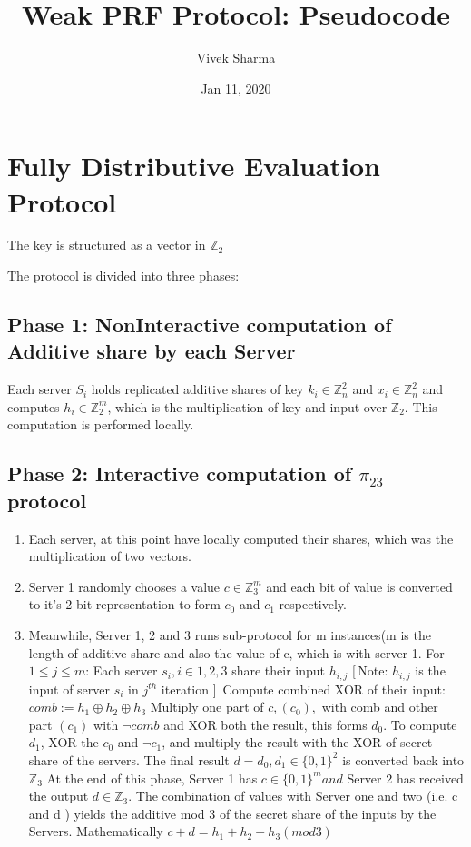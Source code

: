 \documentclass[11pt]{article}
\title{Weak PRF Protocol: Pseudocode}
\author{Vivek Sharma}
\date{Jan 11, 2020}
\begin{document}
\maketitle


\section{Fully Distributive Evaluation Protocol}
The key is structured as a vector in $\mathbb{Z}_2$


The protocol is divided into three phases:

\subsection{Phase 1: NonInteractive computation of Additive share by each Server} 
Each server $S_{i}$ holds replicated additive shares of key $k_{i} \in \mathbb{Z}_{n}^{2}$ and $x_{i} \in \mathbb{Z}_{n}^{2}$ and computes $h_{i} \in \mathbb{Z}_{2}^{m}$, which is the multiplication of key and input over $\mathbb{Z}_2$. This computation is performed locally. 
\subsection{Phase 2: Interactive computation of $\pi_{23}$ protocol}

\begin{enumerate}
	\item Each server, at this point have locally computed their shares, which was the multiplication of two vectors.
	\item Server 1 randomly chooses a value $c \in \mathbb{Z}_{3}^{m}$ and each bit of value is converted to it's 2-bit representation to form $c_{0}$ and $c_{1}$ respectively. 
	\item Meanwhile, Server 1, 2 and 3 runs sub-protocol for m instances(m is the length of additive share and also the value of c, which is with server 1.
	\subitem For $1 \leq j \leq m$:
	\subitem Each server $s_{i} , i \in {1,2,3}$ share their input $h_{i,j}$ [\,Note: $h_{i,j}$ is the input of server $s_{i}$ in $j^{th}$ iteration ]\,
	\subitem Compute combined XOR of their input: $comb := h_{1} \oplus h_{2} \oplus h_{3}$
	\subitem Multiply one part of $c,(c_{0}),$ with comb and other part $(c_{1})$ with $\neg{comb}$ and XOR both the result, this forms $d_{0}$.
	\subitem To compute $d_{1}$, XOR the $c_{0}$ and $\neg{c_{1}}$, and multiply the result with the XOR of secret share of the servers.
	\subitem The final result $d = d_{0}, d_{1} \in \{ 0,1\}^{2}$ is converted back into $\mathbb{Z}_{3}$
	\subitem At the end of this phase, Server 1 has $c \in \{0,1\}^m and $ Server 2 has received the output $d \in \mathbb{Z}_{3}$. The combination of values with Server one and two (i.e. c and d ) yields the additive mod 3 of the secret share of the inputs by the Servers. Mathematically $c + d = h_{1} + h_{2} + h_{3} (mod 3)$
\end{enumerate}
\end{document}
